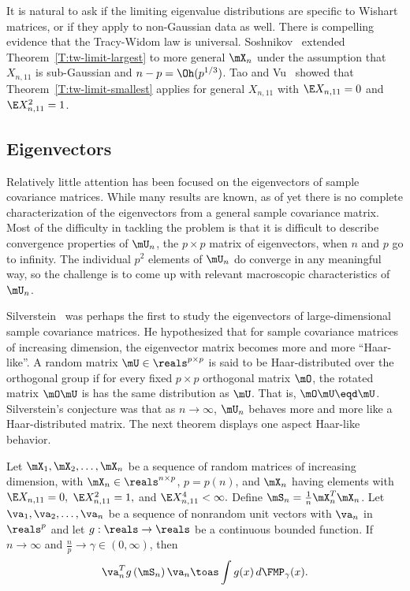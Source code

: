It is natural to ask if the limiting eigenvalue distributions are specific to Wishart matrices, or if they apply to non-Gaussian data as well.  There is compelling evidence that the Tracy-Widom law is universal.   Soshnikov~\cite{soshnikov2002nud} extended Theorem~\ref{T:tw-limit-largest} to more general $\mX_n$ under the assumption that $X_{n,11}$ is sub-Gaussian and $n-p = \Oh(p^{1/3})$.  Tao and Vu~\cite{tao2009rmd} showed that Theorem~\ref{T:tw-limit-smallest} applies for general $X_{n,11}$ with $\E X_{n,11} = 0$ and $\E X_{n,11}^2 = 1$.


\subsection{Eigenvectors}

Relatively little attention has been focused on the eigenvectors of sample covariance matrices.  While many results are known, as of yet there is no complete characterization of the eigenvectors from a general sample covariance matrix.  Most of the difficulty in tackling the problem is that it is difficult to describe convergence properties of $\mU_n$, the $p\times p$ matrix of eigenvectors, when $n$ and $p$ go to infinity.  The individual $p^2$ elements of $\mU_n$ do converge in any meaningful way, so the challenge is to come up with relevant macroscopic characteristics of $\mU_n$.

Silverstein~\cite{silverstein1979reg} was perhaps the first to study the eigenvectors of large-dimensional sample covariance matrices.  He hypothesized that for sample covariance matrices of increasing dimension, the eigenvector matrix becomes more and more ``Haar-like''.  A random matrix $\mU \in \reals^{p\times p}$ is said to be Haar-distributed over the orthogonal group if for every fixed $p \times p$ orthogonal matrix $\mO$, the rotated matrix $\mO \mU$ is has the same distribution as $\mU$.  That is, $\mO \mU \eqd \mU$.  Silverstein's conjecture was that as $n \to \infty$, $\mU_n$ behaves more and more like a Haar-distributed matrix.  The next theorem displays one aspect Haar-like behavior.

\begin{theorem}\label{T:evec-functional-limit}
    Let $\mX_1, \mX_2, \ldots, \mX_n$ be a sequence of random matrices of
    increasing dimension, with $\mX_n \in \reals^{n \times p}$, $p = p(n)$,
    and $\mX_n$ having \iid elements with 
    \(
        \E X_{n,11} = 0,
    \)
    \(
        \E X_{n,11}^2 = 1,
    \)
    and
    \(
        \E X_{n,11}^4 < \infty.
    \)
    Define $\mS_n = \frac{1}{n} \mX_n^T \mX_n$.  Let
    $\va_1, \va_2, \ldots, \va_n$ be a sequence of nonrandom unit vectors with 
    $\va_n$ in $\reals^p$ and let $g : \reals \to \reals$ be a continuous 
    bounded function.  If $n \to \infty$ and
    $\frac{n}{p} \to \gamma \in (0,\infty)$, then
    \[
        \va_n^T g\left( \mS_n \right) \va_n
        \toas
        \int
            g(x)
            \,
            d\FMP_\gamma(x).
    \]
\end{theorem}

